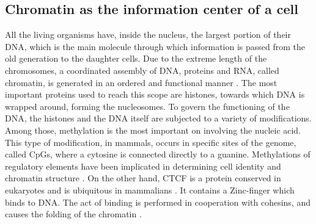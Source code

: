 \subsection{Chromatin as the information center of a cell}
All the living organisms have, inside the nucleus, the largest portion of their DNA, which is the main molecule through which information is passed from the old generation to the daughter cells. Due to the extreme length of the chromosomes, a coordinated assembly of DNA, proteins and RNA, called chromatin, is generated in an ordered and functional manner
\cite{paroBiologyChromatin2021}. 
The most important proteins used to reach this scope are histones, towards which DNA is wrapped around, forming the nucleosomes. To govern the functioning of the DNA, the histones and the DNA itself are subjected to a variety of modifications. Among those, methylation is the most important on  involving the nucleic acid. This type of modification, in mammals, occurs in specific sites of the genome, called CpGs, where a cytosine is connected directly to a guanine. Methylations of regulatory elements have been implicated in determining cell identity and chromatin structure
\cite{liauAdaptiveChromatinRemodeling2017, shareefExtendedrepresentationBisulfiteSequencing2021}. 
On the other hand, CTCF is a protein conserved in eukaryotes and is ubiquitous in mammalians
\cite{kimCTCFMultifunctionalProtein2015a}. 
It contains a Zinc-finger which binds to DNA. The act of binding is performed in cooperation with cohesins, and causes the folding of the chromatin
\cite{hsiehEnhancerPromoterInteractions2022,kimCTCFMultifunctionalProtein2015a}.

